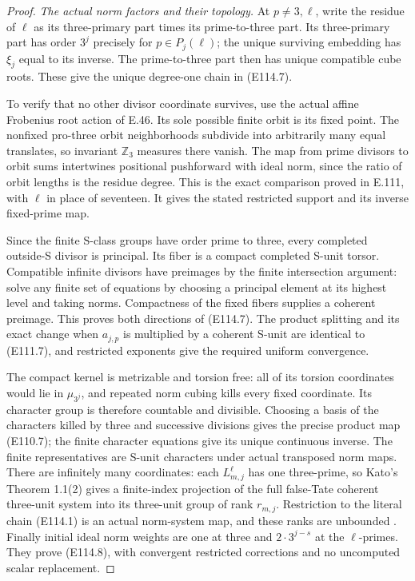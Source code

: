 \begin{proof}
\emph{The actual norm factors and their topology.}
At $p\ne3,\ell$, write the residue of $\ell$ as its
three-primary part times its prime-to-three part.
Its three-primary part has order $3^j$ precisely
for $p\in P_j(\ell)$; the unique surviving embedding
has $\xi_j$ equal to its inverse. The prime-to-three
part then has unique compatible cube roots. These
give the unique degree-one chain in (E114.7).

To verify that no other divisor coordinate survives,
use the actual affine Frobenius root action of E.46.
Its sole possible finite orbit is its fixed point.
The nonfixed pro-three orbit neighborhoods subdivide
into arbitrarily many equal translates, so invariant
$\mathbb Z_3$ measures there vanish. The map from
prime divisors to orbit sums intertwines positional
pushforward with ideal norm, since the ratio of orbit
lengths is the residue degree. This is the exact
comparison proved in E.111, with $\ell$ in place of
seventeen. It gives the stated restricted support
and its inverse fixed-prime map.

Since the finite S-class groups have order prime
to three, every completed outside-S divisor is
principal. Its fiber is a compact completed S-unit
torsor. Compatible infinite divisors have preimages
by the finite intersection argument: solve any
finite set of equations by choosing a principal
element at its highest level and taking norms.
Compactness of the fixed fibers supplies a coherent
preimage. This proves both directions of (E114.7).
The product splitting and its exact change when
$a_{j,p}$ is multiplied by a coherent S-unit are
identical to (E111.7), and restricted exponents
give the required uniform convergence.

The compact kernel is metrizable and torsion free:
all of its torsion coordinates would lie in
$\mu_{3^j}$, and repeated norm cubing kills every
fixed coordinate. Its character group is therefore
countable and divisible. Choosing a basis of the
characters killed by three and successive divisions
gives the precise product map (E110.7); the finite
character equations give its unique continuous
inverse. The finite representatives are S-unit
characters under actual transposed norm maps.
There are infinitely many coordinates: each
$L^{\ell}_{m,j}$ has one three-prime, so Kato's
Theorem 1.1(2) gives a finite-index projection of the
full false-Tate coherent three-unit system into
its three-unit group of rank $r_{m,j}$.
Restriction to the literal chain (E114.1) is an
actual norm-system map, and these ranks are
unbounded \cite{E_KatoUniversalNorms}.
Finally initial ideal norm weights are one at
three and $2\cdot3^{j-s}$ at the $\ell$-primes.
They prove (E114.8), with convergent restricted
corrections and no uncomputed scalar replacement.


\end{proof}
